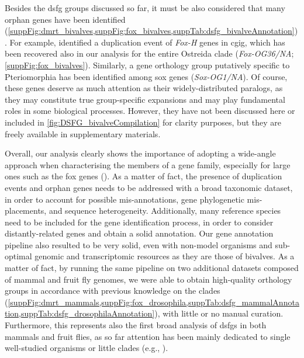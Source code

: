 Besides the \gls{dsfg} groups discussed so far, it must be also considered that many orphan genes have been identified (\cref{suppFig:dmrt_bivalves,suppFig:fox_bivalves,suppTab:dsfg_bivalveAnnotation}). For example,  identified a duplication event of \textit{Fox-H} genes in \gls{cgig}, which has been recovered also in our analysis for the entire Ostreida clade (\textit{Fox-OG36/NA}; \cref{suppFig:fox_bivalves}). Similarly, a gene orthology group putatively specific to Pteriomorphia has been identified among \gls{sox} genes (\textit{Sox-OG1/NA}). Of course, these genes deserve as much attention as their widely-distributed paralogs, as they may constitute true group-specific expansions and may play fundamental roles in some biological processes. However, they have not been discussed here or included in \cref{fig:DSFG_bivalveCompilation} for clarity purposes, but they are freely available in supplementary materials.

Overall, our analysis clearly shows the importance of adopting a wide-angle approach when characterising the members of a gene family, especially for large ones such as the \gls{fox} genes (). As a matter of fact, the presence of duplication events and orphan genes needs to be addressed with a broad taxonomic dataset, in order to account for possible mis-annotations, gene phylogenetic mis-placements, and sequence heterogeneity. Additionally, many reference species need to be included for the gene identification process, in order to consider distantly-related genes and obtain a solid annotation. Our gene annotation pipeline also resulted to be very solid, even with non-model organisms and sub-optimal genomic and transcriptomic resources as they are those of bivalves. As a matter of fact, by running the same pipeline on two additional datasets composed of mammal and fruit fly genomes, we were able to obtain high-quality orthology groups in accordance with previous knowledge on the clades (\cref{suppFig:dmrt_mammals,suppFig:fox_drosophila,suppTab:dsfg_mammalAnnotation,suppTab:dsfg_drosophilaAnnotation}), with little or no manual curation. Furthermore, this represents also the first broad analysis of \glspl{dsfg} in both mammals and fruit flies, as so far attention has been mainly dedicated to single well-studied organisms or little clades (e.g., ).


